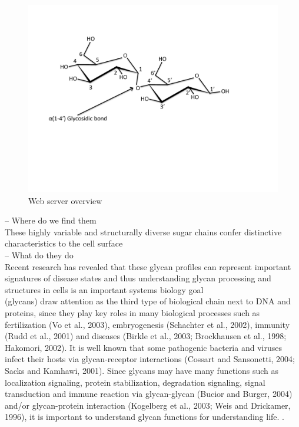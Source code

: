 \documentclass[12pt,a4paper]{article}
\begin{document}
\begin{figure}[H]
\centering 
\includegraphics[scale=0.6]{images/glycosidic_linkage.pdf} 
\caption{Web server overview}
\label{fig:glycosidic_linkage}
\end{figure}
















-- Where do we find them\\

These highly variable and structurally diverse sugar chains confer distinctive characteristics to the cell surface \citep{10.1371/journal.pcbi.1002813} \\



-- What do they do\\

Recent research has revealed that these glycan profiles can represent important signatures of disease states and thus understanding glycan processing and structures in cells is an important systems biology goal \citep{10.1371/journal.pcbi.1002813}\\

(glycans) draw attention as the third type of biological chain next to DNA and proteins, since they play key roles in many biological processes such as fertilization (Vo et al., 2003), embryogenesis (Schachter et al., 2002), immunity (Rudd et al., 2001) and diseases (Birkle et al., 2003; Brockhausen et al., 1998; Hakomori, 2002). It is well known that some pathogenic bacteria and viruses infect their hosts via glycan-receptor interactions (Cossart and Sansonetti, 2004; Sacks and Kamhawi, 2001). Since glycans may have many functions such as localization signaling, protein stabilization, degradation signaling, signal transduction and immune reaction via glycan-glycan (Bucior and Burger, 2004) and/or glycan-protein interaction (Kogelberg et al., 2003; Weis and Drickamer, 1996), it is important to understand glycan functions for understanding life. \citep{doi:10.1093/bioinformatics/bti666}. \\
\end{document}
